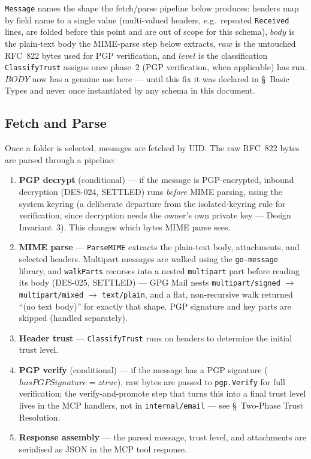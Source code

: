 \documentclass[a4paper,10pt,fleqn]{article}
\begin{document}
\texttt{Message} names the shape the fetch/parse pipeline below
produces: headers map by field name to a single value (multi-valued
headers, e.g.\ repeated \texttt{Received} lines, are folded before
this point and are out of scope for this schema), $body$ is the
plain-text body the MIME-parse step below extracts, $raw$ is the
untouched RFC~822 bytes used for PGP verification, and $level$ is
the classification \texttt{ClassifyTrust} assigns once phase~2 (PGP
verification, when applicable) has run.  $BODY$ now has a genuine use
here --- until this fix it was declared in \S~Basic Types and never
once instantiated by any schema in this document.

\subsection{Fetch and Parse}

Once a folder is selected, messages are fetched by UID.  The raw
RFC~822 bytes are parsed through a pipeline:

\begin{enumerate}
  \item \textbf{PGP decrypt} (conditional) --- if the message is
    PGP-encrypted, inbound decryption (DES-024, SETTLED) runs
    \emph{before} MIME parsing, using the system keyring (a
    deliberate departure from the isolated-keyring rule for
    verification, since decryption needs the owner's own private
    key --- Design Invariant~3).  This changes which bytes MIME
    parse sees.
  \item \textbf{MIME parse} --- \texttt{ParseMIME} extracts the
    plain-text body, attachments, and selected headers.  Multipart
    messages are walked using the \texttt{go-message} library, and
    \texttt{walkParts} recurses into a nested \texttt{multipart} part
    before reading its body (DES-025, SETTLED) --- GPG Mail nests
    \texttt{multipart/signed} $\to$ \texttt{multipart/mixed} $\to$
    \texttt{text/plain}, and a flat, non-recursive walk returned
    ``(no text body)'' for exactly that shape.  PGP signature and key
    parts are skipped (handled separately).
  \item \textbf{Header trust} --- \texttt{ClassifyTrust} runs on
    headers to determine the initial trust level.
  \item \textbf{PGP verify} (conditional) --- if the message has a
    PGP signature ($hasPGPSignature = ztrue$), raw bytes are
    passed to \texttt{pgp.Verify} for full verification; the
    verify-and-promote step that turns this into a final trust level
    lives in the MCP handlers, not in \texttt{internal/email} --- see
    \S~Two-Phase Trust Resolution.
  \item \textbf{Response assembly} --- the parsed message, trust
    level, and attachments are serialised as JSON in the MCP tool
    response.
\end{enumerate}
\end{document}
